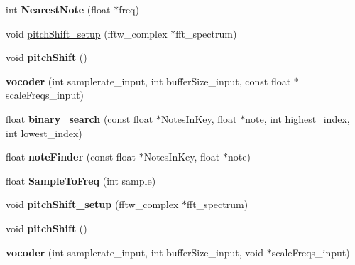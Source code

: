 \begin{DoxyCompactItemize}
\item 
\hypertarget{classvocoder_a8b1e51e28458338abc0eeaac00c1842f}{int {\bfseries Nearest\-Note} (float $\ast$freq)}\label{classvocoder_a8b1e51e28458338abc0eeaac00c1842f}

\item 
void \hyperlink{classvocoder_aa3d122aee6d6ae77ac5b04572e924dc0}{pitch\-Shift\-\_\-setup} (fftw\-\_\-complex $\ast$fft\-\_\-spectrum)
\item 
\hypertarget{classvocoder_aa218678a51da7429066c32e59edd5057}{void {\bfseries pitch\-Shift} ()}\label{classvocoder_aa218678a51da7429066c32e59edd5057}

\item 
\hypertarget{classvocoder_a5e51f2bff73fdb41cb326e0743170b15}{{\bfseries vocoder} (int samplerate\-\_\-input, int buffer\-Size\-\_\-input, const float $\ast$scale\-Freqs\-\_\-input)}\label{classvocoder_a5e51f2bff73fdb41cb326e0743170b15}

\item 
\hypertarget{classvocoder_a7a0b1f788e03878de287d7f6163208a9}{float {\bfseries binary\-\_\-search} (const float $\ast$Notes\-In\-Key, float $\ast$note, int highest\-\_\-index, int lowest\-\_\-index)}\label{classvocoder_a7a0b1f788e03878de287d7f6163208a9}

\item 
\hypertarget{classvocoder_afb731a113935c575939ebdff7ae37580}{float {\bfseries note\-Finder} (const float $\ast$Notes\-In\-Key, float $\ast$note)}\label{classvocoder_afb731a113935c575939ebdff7ae37580}

\item 
\hypertarget{classvocoder_a2b3a6e386d3a18f9366320e5743d33b1}{float {\bfseries Sample\-To\-Freq} (int sample)}\label{classvocoder_a2b3a6e386d3a18f9366320e5743d33b1}

\item 
\hypertarget{classvocoder_aa3d122aee6d6ae77ac5b04572e924dc0}{void {\bfseries pitch\-Shift\-\_\-setup} (fftw\-\_\-complex $\ast$fft\-\_\-spectrum)}\label{classvocoder_aa3d122aee6d6ae77ac5b04572e924dc0}

\item 
\hypertarget{classvocoder_aa218678a51da7429066c32e59edd5057}{void {\bfseries pitch\-Shift} ()}\label{classvocoder_aa218678a51da7429066c32e59edd5057}

\item 
\hypertarget{classvocoder_a759189527108a2f32b992406b8210db8}{{\bfseries vocoder} (int samplerate\-\_\-input, int buffer\-Size\-\_\-input, void $\ast$scale\-Freqs\-\_\-input)}\label{classvocoder_a759189527108a2f32b992406b8210db8}


\end{DoxyCompactItemize}
